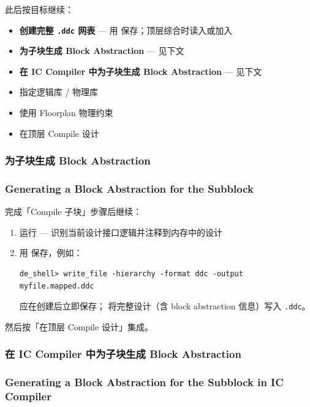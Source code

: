 此后按目标继续：
\begin{itemize}
  \item \textbf{创建完整 \texttt{.ddc} 网表} — 用  保存；顶层综合时读入或加入 
  \item \textbf{为子块生成 Block Abstraction} — 见下文
  \item \textbf{在 IC Compiler 中为子块生成 Block Abstraction} — 见下文
\end{itemize}

\begin{seeAlsoBox}
\begin{itemize}
  \item 指定逻辑库 / 物理库
  \item 使用 Floorplan 物理约束
  \item 在顶层 Compile 设计
\end{itemize}
\end{seeAlsoBox}

\subsubsection{为子块生成 Block Abstraction}
\subsubsection*{Generating a Block Abstraction for the Subblock}

完成「Compile 子块」步骤后继续：
\begin{enumerate}
  \item 运行  — 识别当前设计接口逻辑并注释到内存中的设计
  \item 用  保存，例如：
\begin{lstlisting}
de_shell> write_file -hierarchy -format ddc -output myfile.mapped.ddc
\end{lstlisting}
        应在创建后立即保存； 将完整设计（含 block abstraction 信息）写入 \texttt{.ddc}。
\end{enumerate}

然后按「在顶层 Compile 设计」集成。

\subsubsection{在 IC Compiler 中为子块生成 Block Abstraction}
\subsubsection*{Generating a Block Abstraction for the Subblock in IC Compiler}

